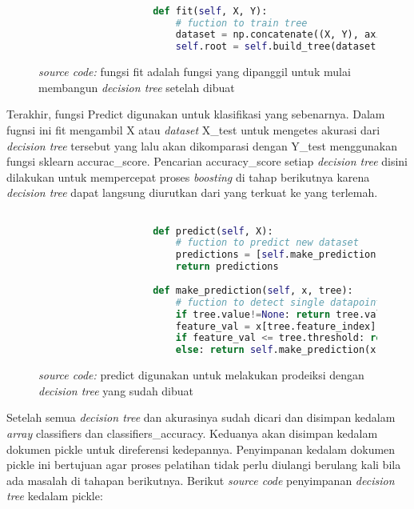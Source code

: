 		\begin{figure}[H]
			\begin{lstlisting}[language=Python, basicstyle=\tiny]

					def fit(self, X, Y):
						# fuction to train tree 
						dataset = np.concatenate((X, Y), axis = 1)
						self.root = self.build_tree(dataset)

			\end{lstlisting}
			\caption{\emph{source code:} fungsi fit adalah fungsi yang dipanggil untuk mulai membangun \emph{decision tree}
			setelah dibuat}
			\label{code: fit function}
		\end{figure}

		Terakhir, fungsi Predict digunakan untuk klasifikasi yang sebenarnya. Dalam fugnsi ini 
		fit mengambil X atau \textit{dataset} X\_test untuk mengetes akurasi dari \emph{decision tree} 
		tersebut yang lalu akan dikomparasi dengan Y\_test menggunakan fungsi sklearn accurac\_score. 
		Pencarian accuracy\_score setiap \emph{decision tree} disini dilakukan untuk 
		mempercepat proses \emph{boosting} di tahap berikutnya karena \emph{decision tree} 
		dapat langsung diurutkan dari yang terkuat ke yang terlemah.

		\begin{figure}[H]
			\begin{lstlisting}[language=Python, basicstyle=\tiny]

					def predict(self, X):
						# fuction to predict new dataset 
						predictions = [self.make_prediction(x, self.root) for x in X]
						return predictions
					
					def make_prediction(self, x, tree):
						# fuction to detect single datapoint
						if tree.value!=None: return tree.value
						feature_val = x[tree.feature_index]
						if feature_val <= tree.threshold: return self.make_prediction(x, tree.left)
						else: return self.make_prediction(x, tree.right)
			\end{lstlisting}
			\caption{\emph{source code:} predict digunakan untuk melakukan prodeiksi 
			dengan \emph{decision tree} yang sudah dibuat}
			\label{code: predict function}
		\end{figure}

		Setelah semua \emph{decision tree} dan akurasinya sudah dicari dan disimpan kedalam 
		\textit{array} classifiers dan classifiers\_accuracy. Keduanya akan disimpan kedalam 
		dokumen pickle untuk direferensi kedepannya. Penyimpanan kedalam dokumen pickle ini bertujuan 
		agar proses pelatihan tidak perlu diulangi berulang kali bila ada masalah di tahapan berikutnya. 
		Berikut \textit{source code} penyimpanan \emph{decision tree} kedalam pickle:

